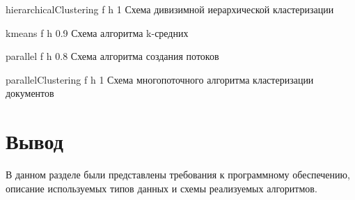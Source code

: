 {hierarchicalClustering} %
{f} %
{h} %
{1\textwidth} %
{Схема дивизимной иерархической кластеризации} %
\clearpage


	{kmeans} %
	{f} %
	{h} %
	{0.9\textwidth} %
	{Схема алгоритма k-средних} %
 \clearpage


{parallel} %
{f} %
{h} %
{0.8\textwidth} %
{Схема алгоритма создания потоков} %
\clearpage

{parallelClustering} %
{f} %
{h} %
{1\textwidth} %
{Схема многопоточного алгоритма кластеризации документов} %


\section *{Вывод}

В данном разделе были представлены требования к программному обеспечению, описание используемых типов данных и схемы реализуемых алгоритмов.
